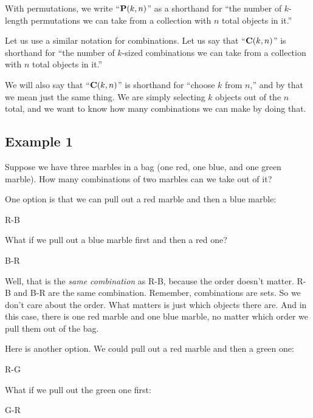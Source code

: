 \documentclass[../../../main.tex]{subfiles}
\begin{document}
With permutations, we write ``$\mathbf{P}(k, n)$'' as a shorthand for ``the number of $k$-length permutations we can take from a collection with $n$ total objects in it.''

Let us use a similar notation for combinations. Let us say that ``$\mathbf{C}(k, n)$'' is shorthand for ``the number of $k$-sized combinations we can take from a collection with $n$ total objects in it.''

We will also say that ``$\mathbf{C}(k, n)$'' is shorthand for ``choose $k$ from $n$,'' and by that we mean just the same thing. We are simply selecting $k$ objects out of the $n$ total, and we want to know how many combinations we can make by doing that.


\subsection{Example 1}

Suppose we have three marbles in a bag (one red, one blue, and one green marble). How many combinations of two marbles can we take out of it?

One option is that we can pull out a red marble and then a blue marble:

\begin{center}
  R-B
\end{center}

\noindent
What if we pull out a blue marble first and then a red one?

\begin{center}
  B-R
\end{center}

\noindent
Well, that is the \emph{same combination} as R-B, because the order doesn't matter. R-B and B-R are the same combination. Remember, combinations are sets. So we don't care about the order. What matters is just which objects there are. And in this case, there is one red marble and one blue marble, no matter which order we pull them out of the bag.

Here is another option. We could pull out a red marble and then a green one:

\begin{center}
  R-G
\end{center}

\noindent
What if we pull out the green one first:

\begin{center}
  G-R
\end{center}
\end{document}
